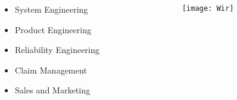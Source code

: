 \documentclass[slidestop,compress,mathserif, aspectratio = 169]{beamer}
\newcommand{\source}[1]{\rotatebox{90}{\tiny \color{gray} #1}}
\begin{document}
{\begin{columns}[t]
\begin{column}[T]{7cm}
\begin{itemize}
{\begin{itemize}
\begin{itemize}
		\item System Engineering
		\item Product Engineering
		\item Reliability Engineering
		\item Claim Management
		\item Sales and Marketing
		\end{itemize}
		\end{itemize}}
     	\end{itemize}
     \end{column}
     	\begin{column}[T]{7cm} 
         	\begin{center}
			\vspace{-.5cm}
            		\texttt{[image: Wir]}\source{}
        		\end{center}
     \end{column}
 \end{columns}
}
\end{document}
